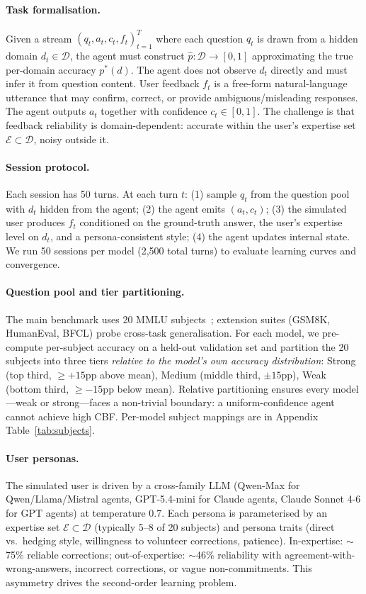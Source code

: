 \documentclass[11pt]{article}
\begin{document}
\paragraph{Task formalisation.} Given a stream $(q_t, a_t, c_t, f_t)_{t=1}^T$ where each question $q_t$ is drawn from a hidden domain $d_t \in \mathcal{D}$, the agent must construct $\hat{p}: \mathcal{D} \to [0,1]$ approximating the true per-domain accuracy $p^*(d)$. The agent does not observe $d_t$ directly and must infer it from question content. User feedback $f_t$ is a free-form natural-language utterance that may confirm, correct, or provide ambiguous/misleading responses. The agent outputs $a_t$ together with confidence $c_t \in [0,1]$. The challenge is that feedback reliability is domain-dependent: accurate within the user's expertise set $\mathcal{E} \subset \mathcal{D}$, noisy outside it.

\paragraph{Session protocol.} Each session has 50 turns. At each turn $t$: (1) sample $q_t$ from the question pool with $d_t$ hidden from the agent; (2) the agent emits $(a_t, c_t)$; (3) the simulated user produces $f_t$ conditioned on the ground-truth answer, the user's expertise level on $d_t$, and a persona-consistent style; (4) the agent updates internal state. We run 50 sessions per model (2{,}500 total turns) to evaluate learning curves and convergence.

\paragraph{Question pool and tier partitioning.} The main benchmark uses 20 MMLU subjects~\citep{hendrycks2021measuring}; extension suites (GSM8K, HumanEval, BFCL) probe cross-task generalisation. For each model, we pre-compute per-subject accuracy on a held-out validation set and partition the 20 subjects into three tiers \emph{relative to the model's own accuracy distribution}: Strong (top third, $\geq +15$pp above mean), Medium (middle third, $\pm 15$pp), Weak (bottom third, $\geq -15$pp below mean). Relative partitioning ensures every model---weak or strong---faces a non-trivial boundary: a uniform-confidence agent cannot achieve high CBF. Per-model subject mappings are in Appendix Table~\ref{tab:subjects}.

\paragraph{User personas.} The simulated user is driven by a cross-family LLM (Qwen-Max for Qwen/Llama/Mistral agents, GPT-5.4-mini for Claude agents, Claude Sonnet 4-6 for GPT agents) at temperature 0.7. Each persona is parameterised by an expertise set $\mathcal{E} \subset \mathcal{D}$ (typically 5--8 of 20 subjects) and persona traits (direct vs.\ hedging style, willingness to volunteer corrections, patience). In-expertise: $\sim$75\% reliable corrections; out-of-expertise: $\sim$46\% reliability with agreement-with-wrong-answers, incorrect corrections, or vague non-commitments. This asymmetry drives the second-order learning problem.
\end{document}
